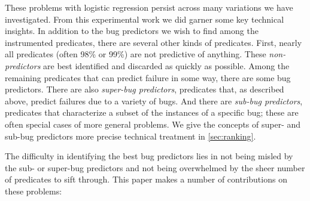 \documentclass[draft]{sig-alternate}
\newcommand{\termdef}[1]{\emph{#1}}
\begin{document}
These problems with logistic regression persist across many variations
we have investigated. From this experimental work we did garner some
key technical insights.  In addition to the bug predictors we wish to
find among the instrumented predicates, there are several other kinds
of predicates.  First, nearly all predicates (often 98\% or 99\%) are
not predictive of anything.  These \termdef{non-predictors} are best identified and discarded as
quickly as possible. Among the remaining predicates that can
predict failure in some way, there are some bug predictors.
There are also \termdef{super-bug predictors}, predicates that, as
described above, predict failures due to a variety of bugs.  And there
are \termdef{sub-bug predictors}, predicates that characterize a subset of
the instances of a specific bug; these are often special cases of more
general problems.  We give the concepts of super- and sub-bug
predictors more precise technical treatment in
\autoref{sec:ranking}.

The difficulty in identifying the best bug predictors lies in not being
misled by the sub- or super-bug predictors and not being overwhelmed
by the sheer number of predicates to sift through.
This paper makes a number of contributions on these problems:
\end{document}
